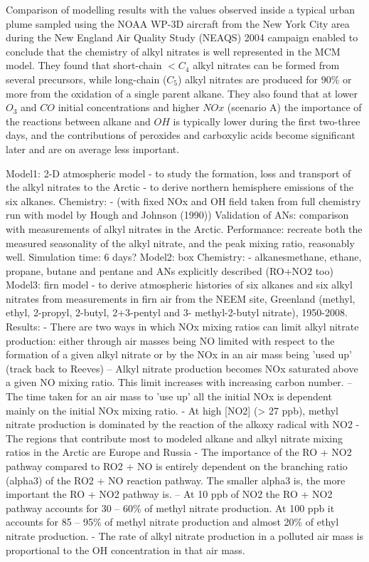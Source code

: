 \documentclass[11pt,a4paper]{article}
\begin{document}
Comparison of modelling results with the values observed inside a typical urban plume sampled using the NOAA WP-3D aircraft from the New York City area during the New England Air Quality Study (NEAQS) 2004 campaign enabled \citep{Sommariva2008} to conclude that the chemistry of alkyl nitrates is well represented in the MCM model. They found that short-chain $<C_4$ alkyl nitrates can be formed from several precursors, while long-chain ($C_5$) alkyl nitrates are produced for 90\% or more from the oxidation of a single parent alkane. They also found that at lower $O_3$ and $CO$ initial concentrations and higher $NOx$ (scenario A) the importance of the reactions between alkane and $OH$ is typically lower during the first two-three days, and the contributions of peroxides and carboxylic acids become significant later and are on average less important.

\citep{Newland2013}
Model1: 2-D atmospheric model
- to study the formation, loss and transport of the alkyl nitrates to the Arctic
- to derive northern hemisphere emissions of the six alkanes.
Chemistry:
- (with fixed NOx and OH field taken from full chemistry run with model by Hough and Johnson (1990))
Validation of ANs: comparison with measurements of alkyl nitrates in the Arctic.
Performance: recreate both the measured seasonality of the alkyl nitrate, and the peak mixing ratio, reasonably well.
Simulation time: 6 days?
Model2: box
Chemistry:
- alkanesmethane, ethane, propane, butane and pentane and ANs explicitly described (RO+NO2 too)
Model3: firn model
- to derive atmospheric histories of six alkanes and six alkyl nitrates from measurements in firn air from the NEEM site, Greenland (methyl, ethyl, 2-propyl, 2-butyl, 2+3-pentyl and 3- methyl-2-butyl nitrate), 1950-2008.
Results:
- There are two ways in which NOx mixing ratios can limit alkyl nitrate production: either through air masses being NO limited with respect to the formation of a given alkyl nitrate or by the NOx in an air mass being 'used up' (track back to Reeves)
-- Alkyl nitrate production becomes NOx saturated above a given NO mixing ratio. This limit increases with increasing carbon number.
-- The time taken for an air mass to 'use up' all the initial NOx is dependent mainly on the initial NOx mixing ratio.
- At high [NO2] (> 27 ppb), methyl nitrate production is dominated by the reaction of the alkoxy radical with NO2
- The regions that contribute most to modeled alkane and alkyl nitrate mixing ratios in the Arctic are Europe and Russia
- The importance of the RO + NO2 pathway compared to RO2 + NO is entirely dependent on the branching ratio (alpha3) of the RO2 + NO reaction pathway. The smaller alpha3 is, the more important the RO + NO2 pathway is.
-- At 10 ppb of NO2 the RO + NO2 pathway accounts for 30 – 60\% of methyl nitrate production. At 100 ppb it accounts for 85 – 95\% of methyl nitrate production and almost 20\% of ethyl nitrate production.
- The rate of alkyl nitrate production in a polluted air mass is proportional to the OH concentration in that air mass.
\end{document}
